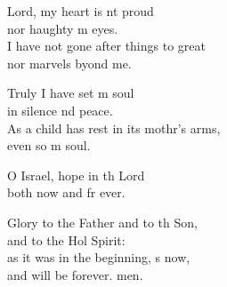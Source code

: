 \settowidth{\versewidth}{As a child has rest in its mother’s arms, *}
\begin{psalmverse}%
  \begin{patverse}
 Lord, my heart is nt proud\Med\\
nor haughty m eyes.\\
I have not gone after things to great\Med\\
nor marvels byond me.

Truly I have set m soul\Med\\
in silence nd peace.\\
As a child has rest in its mothr’s arms,\Med\\
even so m soul.

O Israel, hope in th Lord\Med\\
both now and fr ever.

Glory to the Father and to th Son,\Med\\
and to the Hol Spirit:\\
as it was in the beginning, \pointup{\i}s now,\Med\\
and will be forever. men.
  \end{patverse}
\end{psalmverse}
